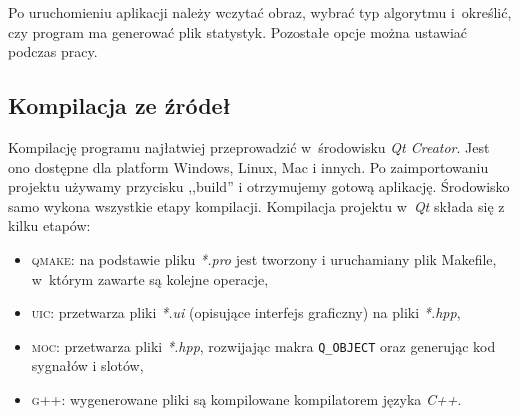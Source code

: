 \documentclass[11pt,a4paper,oneside]{mwart}
\begin{document}
Po uruchomieniu aplikacji należy wczytać obraz, wybrać typ algorytmu i~określić, 
czy program ma generować plik statystyk.
Pozostałe opcje można ustawiać podczas pracy.

\subsection{Kompilacja ze źródeł}
Kompilację programu najłatwiej przeprowadzić w~środowisku \emph{Qt Creator}. 
Jest ono dostępne dla platform Windows, Linux, Mac i innych.
Po zaimportowaniu projektu używamy przycisku ,,build'' i otrzymujemy gotową aplikację.
Środowisko samo wykona wszystkie etapy kompilacji.
Kompilacja projektu w~\emph{Qt} składa się z kilku etapów: 
\begin{itemize}
\item \textsc{qmake}: na podstawie pliku \emph{*.pro} jest tworzony i uruchamiany plik Makefile, 
w~którym zawarte są kolejne operacje,
\item \textsc{uic}: przetwarza pliki \emph{*.ui} (opisujące interfejs graficzny) na pliki \emph{*.hpp},
\item \textsc{moc}: przetwarza pliki \emph{*.hpp}, rozwijając makra \lstinline!Q_OBJECT! 
oraz generując kod sygnałów i slotów,
\item \textsc{g++}: wygenerowane pliki są kompilowane kompilatorem języka \emph{C++}.
\end{itemize}
\end{document}
